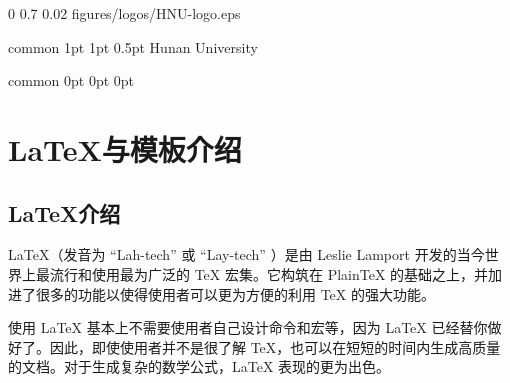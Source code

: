 \documentclass[
    report,     %
    oneside,    %
    UTF8,       %
    zihao=-4    %
]{config} %
\begin{document}

\imageWatermark %
    {0} %
    {0.7} %
    {0.02} %
    {figures/logos/HNU-logo.eps} %


\Header
    {common} %
    {1pt} %
    {1pt} %
    {0.5pt} %
    {Hunan University} %
    {} %
    {\currentChapterInfo} %


\Footer
    {common} %
    {0pt} %
    {0pt} %
    {0pt} %
    {} %
    {\thepage} %
    {} %


\SetArabicPageNumber{} %






\chapter{\LaTeX{}与模板介绍}

\section{\LaTeX{}介绍}

\LaTeX{}（发音为 “Lah-tech” 或 “Lay-tech” ）是由 Leslie Lamport 开发的当今世界上最流行和使用最为广泛的 \TeX{} 宏集。它构筑在 PlainTeX 的基础之上，并加进了很多的功能以使得使用者可以更为方便的利用 \TeX{} 的强大功能。

使用 \LaTeX{} 基本上不需要使用者自己设计命令和宏等，因为 \LaTeX{} 已经替你做好了。因此，即使使用者并不是很了解 \TeX{}，也可以在短短的时间内生成高质量的文档。对于生成复杂的数学公式，\LaTeX{} 表现的更为出色。
\end{document}
